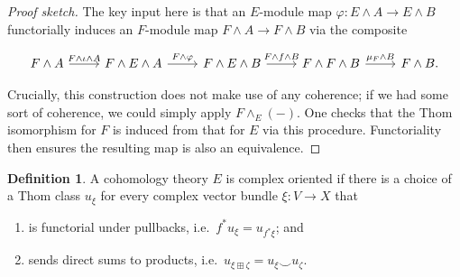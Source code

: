 \documentclass{shortart}
\theoremstyle{definition}
\newtheorem{defi}[thm]{Definition}
\begin{document}
\begin{proof}[Proof sketch]
  The key input here is that an $E$-module map $\varphi: E \wedge A \to E \wedge B$ functorially induces an $F$-module map $F \wedge A \to F \wedge B$ via the composite
  \begin{useimager}
    \[
      \begin{tikzcd}
        F \wedge A  \ar[r, "F \wedge \iota \wedge A"] & F \wedge E \wedge A \ar[r, "F \wedge \varphi"] & F \wedge E \wedge B \ar[r, "F \wedge f \wedge B"] & F \wedge F \wedge B \ar[r, "\mu_F \wedge B"] & F \wedge B.
      \end{tikzcd}
    \]
  \end{useimager}
  Crucially, this construction does not make use of any coherence; if we had some sort of coherence, we could simply apply $F \wedge_E (-)$. One checks that the Thom isomorphism for $F$ is induced from that for $E$ via this procedure. Functoriality then ensures the resulting map is also an equivalence.
\end{proof}

\begin{defi}
  A cohomology theory $E$ is complex oriented if there is a choice of a Thom class $u_\xi$ for every complex vector bundle $\xi: V \to X$ that
  \begin{enumerate}
    \item is functorial under pullbacks, i.e.\ $f^* u_\xi = u_{f^* \xi}$; and
    \item sends direct sums to products, i.e.\ $u_{\xi \boxplus \zeta} = u_\xi\smile u_\zeta$.
  \end{enumerate}
\end{defi}
\end{document}
